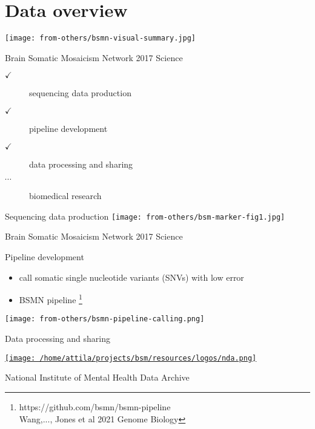 \documentclass[usenames,dvipsnames]{beamer}
\begin{document}
\section{Data overview}

\begin{frame}
\begin{center}
\texttt{[image: from-others/bsmn-visual-summary.jpg]}

{\tiny Brain Somatic Mosaicism Network 2017 Science}
\end{center}
\begin{description}
\item[$\checkmark$] sequencing data production
\item[$\checkmark$] pipeline development
\item[$\checkmark$] data processing and sharing
\item[$\cdots$] biomedical research
\end{description}
\end{frame}

\begin{frame}{Sequencing data production}
\texttt{[image: from-others/bsm-marker-fig1.jpg]}

{\tiny Brain Somatic Mosaicism Network 2017 Science}
\end{frame}

\begin{frame}{Pipeline development}
\begin{itemize}
\item call somatic single nucleotide variants (SNVs) with low error
\item BSMN pipeline
\footnote{https://github.com/bsmn/bsmn-pipeline \\
	Wang,..., Jones et al 2021 Genome Biology}
\end{itemize}
\texttt{[image: from-others/bsmn-pipeline-calling.png]}
\end{frame}

\begin{frame}{Data processing and sharing}
\begin{center}
\href{https://nda.nih.gov/data_structure.html?short_name=genomics_sample03}{\texttt{[image: /home/attila/projects/bsm/resources/logos/nda.png]}}

National Institute of Mental Health Data Archive
\end{center}
\end{frame}
\end{document}
